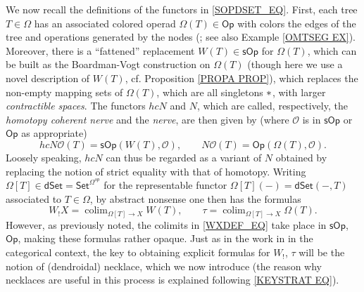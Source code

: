 \documentclass[a4paper,10pt
,draft
]{article}%
\numberwithin{equation}{section}
\numberwithin{figure}{section}
\theoremstyle{definition} %
\newcommand{\Op}{\mathsf{Op}}%
\newcommand{\sOp}{\ensuremath{\mathsf{sOp}}}%
\DeclareMathOperator{\colim}{colim}%
\renewcommand{\O}{\ensuremath{\mathcal O}}
\newcommand{\1}{\ensuremath{\mathbbm 1}}%
\begin{document}
We now recall the definitions of the functors in
\eqref{SOPDSET_EQ}.
First, each tree $T \in \Omega$
has an associated colored operad
$\Omega(T) \in \mathsf{Op}$
with colors the edges of the tree and 
operations generated by the nodes
(\cite[\S 3]{MW07}; see also Example \ref{OMTSEG EX}).
Moreover, there is a ``fattened'' replacement 
$W(T) \in \sOp$ for $\Omega(T)$,
which can be built \cite[Rem. 7.3]{MW09}
as the Boardman-Vogt construction on $\Omega(T)$
(though here we use a novel description of $W(T)$,
cf. Proposition \ref{PROPA PROP}),
which replaces the non-empty mapping sets of 
$\Omega(T)$, which are all singletons $\**$,
with larger \emph{contractible spaces}.
The functors $hcN$ and $N$,
which are called, respectively,
the \emph{homotopy coherent nerve}
and the \emph{nerve},
are then given by (where $\O$ is in $\sOp$ or $\Op$ as appropriate)
\begin{equation}\label{TWONER EQ}
	hcN \O(T) = \sOp(W(T),\O),
	\qquad
	N \O(T) = \Op(\Omega(T),\O).
\end{equation}
Loosely speaking, $hcN$ can thus be regarded as a variant of $N$
obtained by replacing the notion of strict equality with that of homotopy.
Writing 
$\Omega[T]\in \mathsf{dSet} = \mathsf{Set}^{\Omega^{op}}$
for the representable functor
$\Omega[T](-) = \mathsf{dSet}(-,T)$
associated to $T \in \Omega$,
by abstract nonsense one then has the formulas
\begin{equation}\label{WXDEF_EQ}
	W_!X = \colim_{\Omega[T] \to X} W(T),
\qquad
	\tau = \colim_{\Omega[T] \to X} \Omega(T).
\end{equation}
However, as previously noted, 
the colimits in \eqref{WXDEF_EQ}
take place in $\sOp$, $\Op$,
making these formulas rather opaque.
Just as in the work in \cite{DS11} in the categorical context,
the key to obtaining explicit formulas for
$W_!$, $\tau$ will be the notion of (dendroidal) necklace,
which we now introduce
(the reason why necklaces are useful in this process is explained following \eqref{KEYSTRAT EQ}).
\end{document}
